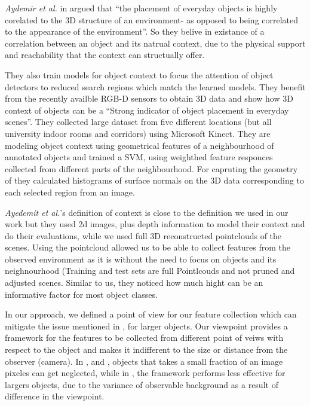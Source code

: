      
     \textit{Aydemir et al.} in  \cite{aydemir2012_3Dcontext} argued that ``the placement of everyday objects is highly corelated to the 3D structure of an environment- as opposed to being correlated to the appearance of the environment''. So they belive in existance of a correlation between an object and its natrual context, due to the physical support and reachability that the context can structually offer. 
     
     They also train models for object context to focus the attention of object detectors to reduced search regions which match the learned models. They benefit from the recently availble RGB-D sensors to obtain 3D data and show how 3D context of objects can be a ``Strong indicator of object placement in everyday scenes''. They collected large dataset from five different locations (but all university indoor rooms and corridors) using Microsoft Kinect. They are modeling object context using geometrical features of a neighbourhood of annotated objects and trained a SVM, using weighthed feature responces collected from different parts of the neighbourhood. For capruting the geometry of they calculated histograms of surface normals on the 3D data corresponding to each selected region from an image.
     
     \textit{Ayedemit et al.}'s definition of context is close to the definition we used in our work but they used 2d images, plus depth information to model their context and do their evaluations, while we used full 3D reconstructed pointclouds of the scenes. Using the pointcloud allowed us to be able to collect features from the observed environment as it is without the need to focus on objects and its neighnourhood (Training and test sets are full Pointlcouds and not pruned and adjusted scenes. Similar to us, they noticed how much hight can be an informative factor for most object classes. 
     
     In our approach, we defined a point of view for our feature collection which can mitigate the issue mentioned in \cite{aydemir2012_3Dcontext}, for larger objects. Our viewpoint provides a framework for the features to be collected from different point of veiws with respect to the object and makes it indifferent to the size or distance from the observer (camera). In \cite{TorralbaContextualPriming}, \cite{TrollbaContexBased} and \cite{PerkoLeonardisContextDriven}, objects that takes a small fraction of an image pixeles can get neglected, while in \cite{aydemir2012_3Dcontext}, the framework performs less effective for largers objects, due to the variance of observable background as a result of difference in the viewpoint. 
     
